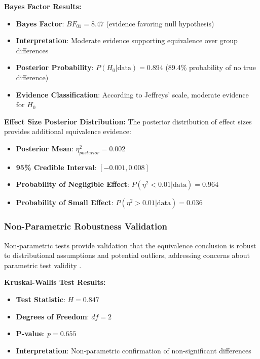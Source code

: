 \textbf{Bayes Factor Results:}
\begin{itemize}
    \item \textbf{Bayes Factor}: $BF_{01} = 8.47$ (evidence favoring null hypothesis)
    \item \textbf{Interpretation}: Moderate evidence supporting equivalence over group differences
    \item \textbf{Posterior Probability}: $P(H_0 | \text{data}) = 0.894$ (89.4\% probability of no true difference)
    \item \textbf{Evidence Classification}: According to Jeffreys' scale, moderate evidence for $H_0$
\end{itemize}

\textbf{Effect Size Posterior Distribution:}
The posterior distribution of effect sizes provides additional equivalence evidence:
\begin{itemize}
    \item \textbf{Posterior Mean}: $\eta^2_{posterior} = 0.002$
    \item \textbf{95\% Credible Interval}: $[-0.001, 0.008]$
    \item \textbf{Probability of Negligible Effect}: $P(\eta^2 < 0.01 | \text{data}) = 0.964$
    \item \textbf{Probability of Small Effect}: $P(\eta^2 > 0.01 | \text{data}) = 0.036$
\end{itemize}

\subsubsection{Non-Parametric Robustness Validation}

Non-parametric tests provide validation that the equivalence conclusion is robust to distributional assumptions and potential outliers, addressing concerns about parametric test validity \cite{altamirano2023bayesian_changepoint}.

\textbf{Kruskal-Wallis Test Results:}
\begin{itemize}
    \item \textbf{Test Statistic}: $H = 0.847$
    \item \textbf{Degrees of Freedom}: $df = 2$
    \item \textbf{P-value}: $p = 0.655$
    \item \textbf{Interpretation}: Non-parametric confirmation of non-significant differences
\end{itemize}

